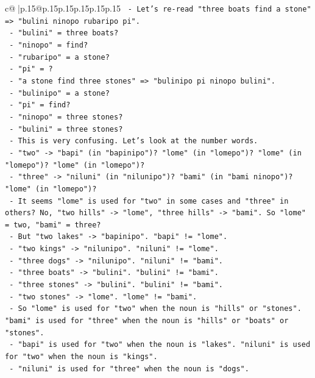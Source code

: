 \documentclass{article}
\begin{document}
{\begin{supertabular}{c@{$\;$}|p{.15\linewidth}@{}p{.15\linewidth}p{.15\linewidth}p{.15\linewidth}p{.15\linewidth}p{.15\linewidth}}
{{{\texttt{    {-} Let's re{-}read "three boats find a stone" => "bulini ninopo rubaripo pi".} \\
\texttt{      {-} "bulini" = three boats?} \\
\texttt{      {-} "ninopo" = find?} \\
\texttt{      {-} "rubaripo" = a stone?} \\
\texttt{      {-} "pi" = ?} \\
\texttt{    {-} "a stone find three stones" => "bulinipo pi ninopo bulini".} \\
\texttt{      {-} "bulinipo" = a stone?} \\
\texttt{      {-} "pi" = find?} \\
\texttt{      {-} "ninopo" = three stones?} \\
\texttt{      {-} "bulini" = three stones?} \\
\texttt{    {-} This is very confusing. Let's look at the number words.} \\
\texttt{    {-} "two" {-}> "bapi" (in "bapinipo")? "lome" (in "lomepo")? "lome" (in "lomepo")? "lome" (in "lomepo")?} \\
\texttt{    {-} "three" {-}> "niluni" (in "nilunipo")? "bami" (in "bami ninopo")? "lome" (in "lomepo")?} \\
\texttt{    {-} It seems "lome" is used for "two" in some cases and "three" in others? No, "two hills" {-}> "lome", "three hills" {-}> "bami". So "lome" = two, "bami" = three?} \\
\texttt{    {-} But "two lakes" {-}> "bapinipo". "bapi" != "lome".} \\
\texttt{    {-} "two kings" {-}> "nilunipo". "niluni" != "lome".} \\
\texttt{    {-} "three dogs" {-}> "nilunipo". "niluni" != "bami".} \\
\texttt{    {-} "three boats" {-}> "bulini". "bulini" != "bami".} \\
\texttt{    {-} "three stones" {-}> "bulini". "bulini" != "bami".} \\
\texttt{    {-} "two stones" {-}> "lome". "lome" != "bami".} \\
\texttt{    {-} So "lome" is used for "two" when the noun is "hills" or "stones". "bami" is used for "three" when the noun is "hills" or "boats" or "stones".} \\
\texttt{    {-} "bapi" is used for "two" when the noun is "lakes". "niluni" is used for "two" when the noun is "kings".} \\
\texttt{    {-} "niluni" is used for "three" when the noun is "dogs".} \\
}}}
\end{supertabular}}
\end{document}
